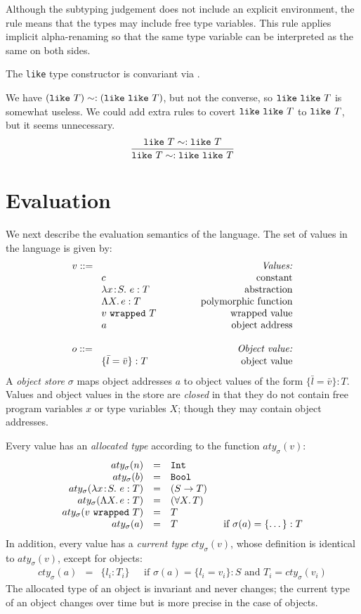 \documentclass{article}
\newcommand{\lam}[4]{\lambda#1\!:\!#2.\,\,#4:#3}
\newcommand{\lamt}[2]{#1\rightarrow #2}
\newcommand{\Int}{\t{Int}}
\newcommand{\Bool}{\t{Bool}}
\newcommand{\Lam}[3]{\Lambda #1.\,#2:#3}
\newcommand{\Forall}[2]{\forall #1.\,#2}
\newcommand{\subtype}[2]{#1 \,\sword\, #2}
\renewcommand{\subtype}[2]{\compatible{#1}{#2}}
\newcommand{\sword}{\mbox{\,\,$<:$\,\,}}
\renewcommand{\t}[1]{{\tt #1}}
\newcommand{\objty}[1]{\{#1\}}
\newcommand{\obje}[2]{\{#1\}:{#2}}
\newcommand{\likety}[1]{\t{like}~#1}
\newcommand{\wrapv}[2]{#1~\t{wrapped}~#2}
\newcommand{\compatible}[2]{#1 \sim: #2 }
\newcommand{\allocty}[1]{aty_{\sigma}(#1)}
\newcommand{\curty}[1]{cty_{\sigma}(#1)}
\begin{document}
Although the subtyping judgement does not include an explicit environment, the rule  means that the types may include free type variables. This rule applies implicit alpha-renaming so that the same type variable can be interpreted as the same on both sides.

The \t{like} type constructor is convariant via .
 
 We have $\compatible{({\likety{T}})}{({\likety{\likety{T}}})}$, but not the converse, so ${\likety{\likety{T}}}$ is somewhat useless. We could add extra rules to covert ${\likety{\likety{T}}}$ to $\likety T$, but it seems unnecessary.
\[
	\frac{
			\compatible {\likety T} {\likety T}
		}{
			\subtype {\likety T} {\likety {\likety T}}
		}
\]

\clearpage
\section{Evaluation}

We next describe the evaluation semantics of the language. 
The set of values in the language is given by:
\[
\begin{array}{llr}
	\mydefhead{v ::=\qquad\qquad\qquad\qquad\qquad}{Values:} 
	\mydefcase{c								}{constant} 
	\mydefcase{\lam{x}{S}{T}{e} 				}{abstraction} 
	\mydefcase{\Lam X e T					}{polymorphic function} 
	\mydefcase{\wrapv{v}{T}	 				}{wrapped value} 
	\mydefcase{a								}{object address}
	\\
	\mydefhead{o ::=\qquad\qquad\qquad\qquad\qquad}{Object value:} 
	\mydefcase{\obje{\bar l = \bar v}{T}		}{object value}
\end{array}
\]
A \emph{object store} $\sigma$ maps object addresses $a$ to object values of the form $\obje{\bar{l}=\bar v}{T}$.
Values and object values in the store are \emph{closed} in that they do not contain free program variables $x$ or type variables $X$;
though they may contain object addresses.

Every value has an \emph{allocated type} according to the function $\allocty{v}$:
\[
\begin{array}{rcll}
		\allocty{n}&=&\Int \\
		\allocty{b}&=&\Bool\\
		\allocty{\lam{x}{S}{T}{e}}&=&(\lamt{S}{T})\\
		\allocty{\Lam X e T}&=&(\Forall X T)\\
		\allocty{\wrapv{v}{T}}&=&T\\
		\allocty{a}&=&T   &\mbox{~~if } 		\sigma(a)=\obje{\dots}{T}
\end{array}
\]
In addition, every value has a \emph{current type} $\curty{v}$, whose definition is identical to $\allocty{v}$, except for objects:
\[
\begin{array}{rcll}
		\curty{a}&=& \objty{l_i:T_i}    &\mbox{~~if  $\sigma(a)=\obje{l_i=v_i}{S}$ and $T_i=\curty{v_i}$}
\end{array}
\]
The allocated type of an object is invariant and never changes; the current type of an object changes over time but is more precise in the case of objects.
\end{document}
